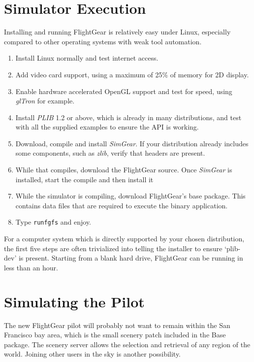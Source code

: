 \documentclass[a4paper,10pt]{article}
\begin{document}
\section*{Simulator Execution}
%
%
Installing and running FlightGear is relatively easy under Linux,
especially compared to other operating systems with weak tool automation.
\begin{enumerate}
\item Install Linux normally and test internet access.
\item Add video card support, using a maximum of 25\% of memory for 2D display.
\item Enable hardware accelerated OpenGL support and test for speed,
using \textsl{glTron}\cite{gltron} for example.
\item Install \textsl{PLIB} 1.2 or above,
which is already in many distributions,
and test with all the supplied examples to ensure the API is working.
\item Download, compile and install \textsl{SimGear}.
If your distribution already 
includes some components, such as
\textsl{zlib}, verify that headers are present.
\item While that compiles, download the FlightGear source.
Once \textsl{SimGear} is installed, start the compile and then install it
\item While the simulator is compiling, download FlightGear's base package.
This contains data files that are required to execute the binary application.
\item Type {\tt runfgfs} and enjoy.
\end{enumerate}

For a computer system which is directly supported by your chosen distribution,
the first five steps are often trivialized into telling the installer to 
ensure `plib-dev' is present.
Starting from a blank hard drive,
FlightGear can be running in less than an hour.
%
%
\section*{Simulating the Pilot}
%
The new FlightGear pilot will probably not want to remain within the San
Francisco bay area, which is the small scenery patch included in the 
Base package.
The scenery server allows the selection and retrieval of any region of the
world.  Joining other users in the sky is another possibility.
\end{document}
